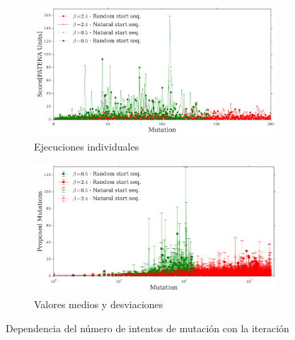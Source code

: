 \begin{figure}[htbp]
\advance\leftskip-1.5cm
  \begin{subfigure}[b]{\textwidth}
    \includegraphics[width=1.1\textwidth]{img/resultados/iterationVsMutAttempts-individual.png}
    \caption{Ejecuciones individuales}
    \label{fig:mutAttemptsVsite-a}
  \end{subfigure}
  \begin{subfigure}[b]{\textwidth}
      \includegraphics[width=1.1\textwidth]{img/resultados/iterationVsMutAttempts-mean.png}
    \caption{Valores medios y desviaciones}
  \label{fig:mutAttemptsVsite-b}
  \end{subfigure}
  \caption{Dependencia del número de intentos de mutación con la iteración}
  \label{fig:mutAttemptsVsite}
\end{figure}

